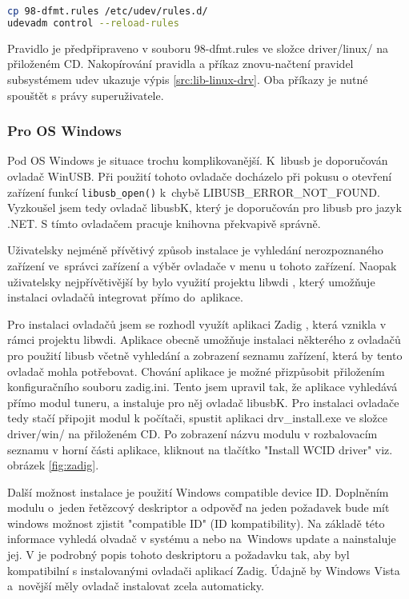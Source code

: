 \begin{lstlisting}[language=bash, label=src:lib-linux-drv, caption=Přídání udev pravidla.]
cp 98-dfmt.rules /etc/udev/rules.d/
udevadm control --reload-rules
\end{lstlisting}

Pravidlo je předpřipraveno v souboru 98-dfmt.rules ve složce driver/linux/ na přiloženém CD. Nakopírování pravidla a příkaz znovu-načtení pravidel subsystémem udev ukazuje výpis \ref{src:lib-linux-drv}. Oba příkazy je nutné spouštět s právy superuživatele.

\subsubsection{Pro OS Windows}
Pod OS Windows je situace trochu komplikovanější. K~libusb je doporučován ovladač WinUSB. Při použití tohoto ovladače docházelo při pokusu o otevření zařízení funkcí \verb|libusb_open()| k~chybě LIBUSB\_ERROR\_NOT\_FOUND. Vyzkoušel jsem tedy ovladač libusbK, který je doporučován pro libusb pro jazyk .NET. S tímto ovladačem pracuje knihovna překvapivě správně.

Uživatelsky nejméně přívětivý způsob instalace je vyhledání nerozpoznaného zařízení ve~správci zařízení a výběr ovladače v menu u tohoto zařízení. Naopak uživatelsky nejpřívětivější by bylo využití projektu libwdi \cite{libwdi}, který umožňuje instalaci ovladačů integrovat přímo do~aplikace.


Pro instalaci ovladačů jsem se rozhodl využít aplikaci Zadig \cite{zadig}, která vznikla v rámci projektu libwdi. Aplikace obecně umožňuje instalaci některého z ovladačů pro použití libusb včetně vyhledání a zobrazení seznamu zařízení, která by tento ovladač mohla potřebovat. Chování aplikace je možné přizpůsobit přiložením konfiguračního souboru zadig.ini. Tento jsem upravil tak, že aplikace vyhledává přímo modul tuneru, a instaluje pro něj ovladač libusbK. Pro instalaci ovladače tedy stačí připojit modul k počítači, spustit aplikaci drv\_install.exe ve složce driver/win/ na přiloženém CD. Po zobrazení názvu modulu v rozbalovacím seznamu v horní části aplikace, kliknout na tlačítko "Install WCID driver" viz. obrázek \ref{fig:zadig}.

Další možnost instalace je použití Windows compatible device ID. Doplněním modulu o~jeden řetězcový deskriptor a odpověď na jeden požadavek bude mít windows možnost zjistit "compatible ID" (ID kompatibility). Na základě této informace vyhledá olvadač v systému a nebo na~Windows update a nainstaluje jej. V \cite{wcid} je podrobný popis tohoto deskriptoru a požadavku tak, aby byl kompatibilní s instalovanými ovladači aplikací Zadig. Údajně by Windows Vista a~novější měly ovladač instalovat zcela automaticky. 


